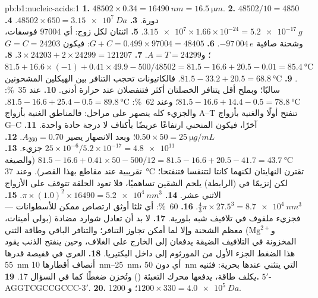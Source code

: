 \begin{solution}{pb:b1:nucleic-acids:1}
\textbf{1.} $\num{48502}\times 0.34 = \qty{16490}{nm} = \qty{16.5}{\micro m}$.
\textbf{2.} $\num{48502}/10 = 4850$ دورة.
\textbf{3.} $\num{48502}\times 650 = \qty{3.15e7}{Da}$.
\textbf{4.} $\num{3.15e7}\times 1.66\times 10^{-24} = \qty{5.2e-17}{g}$.
\textbf{5.} اثنتان لكل زوج: أي \num{97004} فوسفات، وشحنة صافية
$-97\,004\,e$.
\textbf{6.} $G + C = 0.499\times\num{97004} = \num{48405}$: فيكون
$G = C =
\num{24203}$؛ و$A = T = \num{24299}$.
\textbf{7.} $3\times\num{24203} + 2\times\num{24299} = \num{121207}$.
\textbf{8.} $81.5 + 16.6\times(-1) + 0.41\times 49.9 - 500/48502 =
81.5 - 16.6 + 20.5 - 0.01 = \qty{85.4}{\celsius}$.
\textbf{9.} $81.5 - 33.2 + 20.5 = \qty{68.8}{\celsius}$. فالكاتيونات
تحجب التنافر بين الهيكلين المشحونين سالبًا؛ وبملح أقل يتنافر الخصلتان
أكثر فتنفصلان عند حرارة أدنى.
\textbf{10.} عند \qty{35}{\%}: $81.5 - 16.6 + 14.4 - 0.5 =
\qty{78.8}{\celsius}$؛ وعند \qty{62}{\%}: $81.5 - 16.6 + 25.4 - 0.5 =
\qty{89.8}{\celsius}$. والجزيء كله ينصهر على مراحل: فالمناطق الغنية
بأزواج A--T تنفتح أولًا والغنية بأزواج G--C آخرًا، فيكون المنحني ارتفاعًا
عريضًا بأكتاف لا درجة حادة واحدة.
\textbf{11.} $0.50\times 50 = \qty{25}{\micro g/mL}$؛ وبعد الانصهار
يصير $A_{260} = 0.70$.
\textbf{12.} $25\times 10^{-6}/5.2\times 10^{-17} = \num{4.8e11}$ جزيء.
\textbf{13.} $81.5 - 16.6 + 0.41\times 50 - 500/12 = 81.5 - 16.6 + 20.5
- 41.7 = \qty{43.7}{\celsius}$ (والصيغة تقريبية عند مقاطع بهذا
القصر). وعند \qty{37}{\celsius} تقترن النهايتان لكنهما كانتا لتتنفسا
فتنفتحا؛ لكن إنزيمًا في  (الرابطة) يلحم الشقين تساهميًا، فلا
تعود الحلقة تتوقف على الأزواج الاثني عشر.
\textbf{14.} $\pi\times(1.0)^2\times\num{16490} = \qty{5.2e4}{nm^3}$.
\textbf{15.} $\frac{4}{3}\pi\times 27.5^3 = \qty{8.7e4}{nm^3}$.
\textbf{16.} \qty{60}{\%}: أي ثلثا أوثق ارتصاص ممكن للأسطوانات ---
فجزيء  ملفوف في تلافيف شبه بلورية.
\textbf{17.} لا بد أن تعادل شوارد مضادة (بولي أمينات،
و$\mathrm{Mg^{2+}}$) معظم الشحنة وإلا لما أمكن تجاوز التنافر؛
والتنافر الباقي وطاقة الثني المخزونة في التلافيف الضيقة يدفعان إلى
الخارج على الغلاف، وحين ينفتح الذنب يقود هذا الضغط الجزء الأول من
المورثوم إلى داخل البكتيريا.
\textbf{18.} العرى في قفيصة قدرها \qty{55}{nm} أنصاف أقطارها
\qtyrange{10}{25}{nm}، أي دون \qty{50}{nm} التي ينثني عندها 
بحرية: فثنيه يكلف طاقة، يدفعها محرك التعبئة () وتُخزن ضغطًا كما في
السؤال 17.
\textbf{19.} $5'$-AGGTCGCCGCCC-$3'$.
\textbf{20.} \num{1200} ؛ و$1200\times 330 = \qty{4.0e5}{Da}$.

\end{solution}
